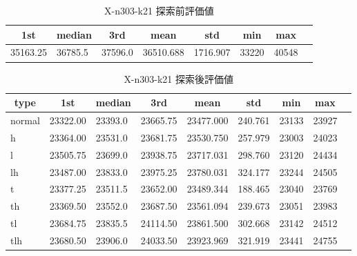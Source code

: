 \begin{table}[htbp]
    \caption{X-n303-k21 探索前評価値}
    \begin{tabular}{|l|l|l|l|l|l|l|l|}\hline
    \multicolumn{1}{|c|}{\textbf{1st}}
    &\multicolumn{1}{c|}{\textbf{median}}
    &\multicolumn{1}{c|}{\textbf{3rd}}
    &\multicolumn{1}{c|}{\textbf{mean}}
    &\multicolumn{1}{c|}{\textbf{std}}
    &\multicolumn{1}{c|}{\textbf{min}}
    &\multicolumn{1}{c|}{\textbf{max}}\\\hline
	35163.25 & 36785.5 & 37596.0 & 36510.688 & 1716.907 & 33220 & 40548\\\hline
	\end{tabular}
\end{table}
\begin{table}[htbp]
    \caption{X-n303-k21 探索後評価値}
    \begin{tabular}{|l|l|l|l|l|l|l|l|l|}\hline
    \multicolumn{1}{|c|}{\textbf{type}}
    &\multicolumn{1}{|c|}{\textbf{1st}}
    &\multicolumn{1}{c|}{\textbf{median}}
    &\multicolumn{1}{c|}{\textbf{3rd}}
    &\multicolumn{1}{c|}{\textbf{mean}}
    &\multicolumn{1}{c|}{\textbf{std}}
    &\multicolumn{1}{c|}{\textbf{min}}
    &\multicolumn{1}{c|}{\textbf{max}}\\\hline
	normal & 23322.00 & 23393.0 & 23665.75 & 23477.000 & 240.761 & 23133 & 23927\\\hline
	h & 23364.00 & 23531.0 & 23681.75 & 23530.750 & 257.979 & 23003 & 24023\\\hline
	l & 23505.75 & 23699.0 & 23938.75 & 23717.031 & 298.760 & 23120 & 24434\\\hline
	lh & 23487.00 & 23833.0 & 23975.25 & 23780.031 & 324.177 & 23244 & 24505\\\hline
	t & 23377.25 & 23511.5 & 23652.00 & 23489.344 & 188.465 & 23040 & 23769\\\hline
	th & 23369.50 & 23552.0 & 23687.50 & 23561.094 & 239.673 & 23051 & 23983\\\hline
	tl & 23684.75 & 23835.5 & 24114.50 & 23861.500 & 302.668 & 23142 & 24512\\\hline
	tlh & 23680.50 & 23906.0 & 24033.50 & 23923.969 & 321.919 & 23441 & 24755\\\hline
	\end{tabular}
\end{table}
